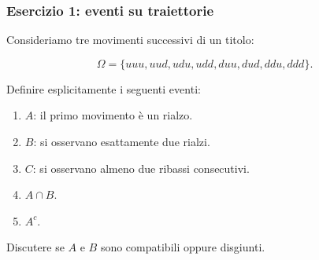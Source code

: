 \documentclass[handout]{beamer}%
\newenvironment{stepenumerate}{\begin{enumerate}[<+->]}{\end{enumerate}}
\providecommand{\1}{\mathbf{1}}
\providecommand{\QTR}[2]{\csname #1\endcsname{#2}}
\begin{document}
\begin{frame}%
%

\frametitle{Esercizio 1: eventi su traiettorie}%


Consideriamo tre movimenti successivi di un titolo:%

\[
\Omega=\{uuu,uud,udu,udd,duu,dud,ddu,ddd\}.
\]


\medskip

Definire esplicitamente i seguenti eventi:

\begin{stepenumerate}
\item[1.] $A$: il primo movimento \`{e} un rialzo.

\item[2.] $B$: si osservano esattamente due rialzi.

\item[3.] $C$: si osservano almeno due ribassi consecutivi.

\item[4.] $A\cap B$.

\item[5.] $A^{c}$.
\end{stepenumerate}

\medskip

Discutere se $A$ e $B$ sono compatibili oppure disgiunti.%

\transboxout
\end{frame}%


%
\end{document}
